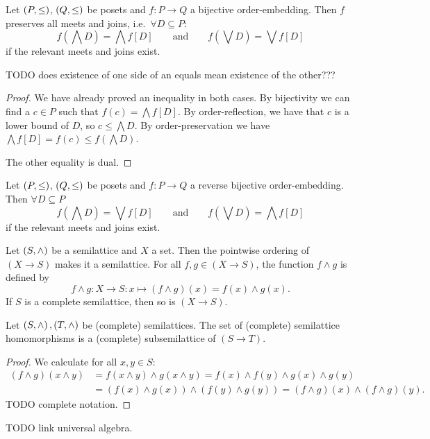 \begin{lemma}
Let $\left( P,\leq \right)$, $\left( Q,\leq \right)$ be posets and $f: P\to Q$ a bijective order-embedding.
Then $f$ preserves all meets and joins, i.e.\ $\forall D\subseteq P$:
\[ f(\bigwedge D) = \bigwedge f[D] \qquad\text{and}\qquad f(\bigvee D) = \bigvee f[D] \]
if the relevant meets and joins exist.
\end{lemma}
TODO does existence of one side of an equals mean existence of the other???
\begin{proof}
We have already proved an inequality in both cases. By bijectivity we can find a $c\in P$ such that $f(c) = \bigwedge f[D]$. By order-reflection, we have that $c$ is a lower bound of $D$, so $c\leq \bigwedge D$. By order-preservation we have $\bigwedge f[D] = f(c) \leq f(\bigwedge D)$.

The other equality is dual.
\end{proof}
\begin{corollary} \label{orderReversingSimilarityLatticeOperations}
Let $\left( P,\leq \right)$, $\left( Q,\leq \right)$ be posets and $f: P\to Q$ a reverse bijective order-embedding. Then $\forall D\subseteq P$
\[ f(\bigwedge D) = \bigvee f[D] \qquad\text{and}\qquad f(\bigvee D) = \bigwedge f[D] \]
if the relevant meets and joins exist.
\end{corollary}

\begin{proposition}
Let $\left( S,\wedge \right)$ be a semilattice and $X$ a set. Then the pointwise ordering of $(X\to S)$ makes it a semilattice. For all $f,g\in (X\to S)$, the function $f\wedge g$ is defined by
\[ f\wedge g: X\to S: x\mapsto (f\wedge g)(x) = f(x) \wedge g(x). \]
If $S$ is a complete semilattice, then so is $(X\to S)$.
\end{proposition}

\begin{proposition} \label{semilatticeOfSemilatticeHomomorphisms}
Let $\left( S,\wedge \right), \left( T, \wedge \right)$ be (complete) semilattices. The set of (complete) semilattice homomorphisms is a (complete) subsemilattice of $(S\to T)$.
\end{proposition}
\begin{proof}
We calculate for all $x,y\in S$:
\begin{align*}
(f\wedge g)(x\wedge y) &= f(x\wedge y)\wedge g(x\wedge y) = f(x)\wedge f(y) \wedge g(x) \wedge g(y) \\
&= (f(x)\wedge g(x))\wedge(f(y)\wedge g(y)) = (f\wedge g)(x) \wedge (f\wedge g)(y).
\end{align*}
TODO complete notation.
\end{proof}
TODO link universal algebra.

